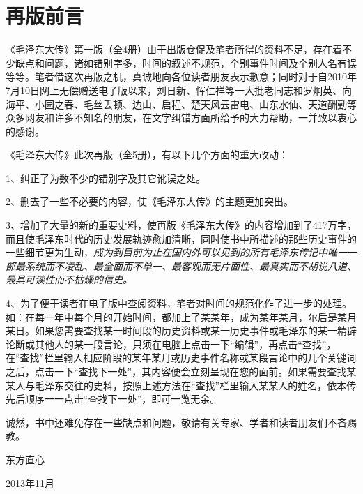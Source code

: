 \documentclass[../../dazhuan.tex]{subfiles}
\begin{document}
\clearpage
\chapter*{再版前言}

   
《毛泽东大传》第一版（全4册）由于出版仓促及笔者所得的资料不足，存在着不少缺点和问题，诸如错别字多，时间的叙述不规范，个别事件时间及个别人名有误等等。笔者借这次再版之机，真诚地向各位读者朋友表示歉意；同时对于自2010年7月10日网上无偿赠送电子版以来，刘日新、恽仁祥等一大批老同志和罗炯英、向海平、小园之春、毛丝丢顿、边山、启程、楚天风云雷电、山东水仙、天道酬勤等众多网友和许多不知名的朋友，在文字纠错方面所给予的大力帮助，一并致以衷心的感谢。

《毛泽东大传》此次再版（全5册），有以下几个方面的重大改动：

1、纠正了为数不少的错别字及其它讹误之处。

2、删去了一些不必要的内容，使《毛泽东大传》的主题更加突出。

3、增加了大量的新的重要史料，使再版《毛泽东大传》的内容增加到了417万字，而且使毛泽东时代的历史发展轨迹愈加清晰，同时使书中所描述的那些历史事件的一些细节更为生动，\emph{成为到目前为止在国内外可以见到的所有毛泽东传记中唯一一部最系统而不凌乱、最全面而不单一、最客观而无片面性、最真实而不胡说八道、最具可读性而不枯燥的信史。}

4、为了便于读者在电子版中查阅资料，笔者对时间的规范化作了进一步的处理。如：在每一年中每个月的开始时间，都加上了某某年，成为某年某月，尔后是某月某日。如果您需要查找某一时间段的历史资料或某一历史事件或毛泽东的某一精辟论断或其他人的某一段言论，只须在电脑上点击一下“编辑”，再点击“查找”，在“查找”栏里输入相应阶段的某年某月或历史事件名称或某段言论中的几个关键词之后，点击一下“查找下一处”，其内容便会立刻呈现在您的面前。如果需要查找某某人与毛泽东交往的史料，按照上述方法在“查找”栏里输入某某人的姓名，依本传先后顺序一一点击“查找下一处”，即可一览无余。

诚然，书中还难免存在一些缺点和问题，敬请有关专家、学者和读者朋友们不吝赐教。

\begin{sign}
	东方直心
	
	2013年11月
\end{sign}
\end{document}

